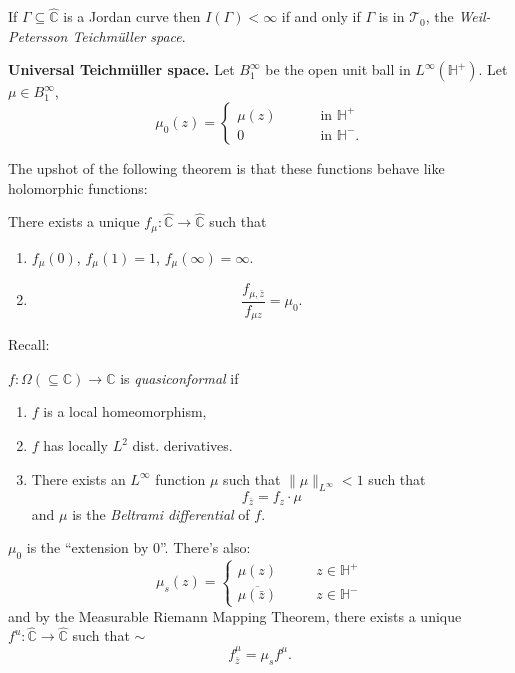 \begin{theorem}[Wang]
\label{theorem-wang}
If $\Gamma \subseteq \hat{ \mathbb{C}}$
is a Jordan curve then
$I(\Gamma) < \infty$ if and only if
$\Gamma$ is in $\mathcal{T}_0$,
the {\it Weil-Petersson Teichmüller space}.
\end{theorem}

\medskip\noindent
{\bf Universal Teichmüller space.}
Let
$B_1^{\infty}$ be the open unit ball in
$L^\infty(\mathbb{H}^+)$.
Let $\mu \in B_1^\infty$,
$$
\mu_0(z)=
\begin{cases}
\mu(z)\qquad &\text{ in }\mathbb{H}^+ \\
0\qquad &\text{ in }\mathbb{H}^-.
\end{cases}
$$

The upshot of the following theorem
is that these functions behave
like holomorphic functions:

\begin{theorem}
\label{theorem-measurable-rmt}
There exists a unique $f_\mu:\hat{\mathbb{C}}
\to \hat{\mathbb{C}}$ such that
\begin{enumerate}
\item $f_\mu(0)$, $f_\mu(1)=1$,
 $f_\mu(\infty)=\infty$.
\item 
$$
\frac{f_{\mu,\bar{z}}}{
f_{\mu z}}=\mu_0.
$$
\end{enumerate}
\end{theorem}

\noindent
Recall:

\begin{definition}
\label{definition-quasiconformal-map}
$f:\Omega(\subseteq\mathbb{C})
\to \mathbb{C}$
is {\it quasiconformal} if
\begin{enumerate}
\item $f$ is a local homeomorphism,
\item $f$ has locally $L^2$ 
dist. derivatives.
\item There exists an $L^\infty$
function $\mu$ such that
$\|\mu\|_{L^\infty}<1$ such that
$$
f_{\bar{z}}=f_z\cdot \mu
$$
and $\mu$ is the {\it Beltrami differential} 
of $f$.
\end{enumerate}
\end{definition}

\noindent
$\mu_0$ is the ``extension by $0$''.
There's also:
$$
\mu_s(z)
=\begin{cases}
\mu(z)\qquad &z \in \mathbb{H}^+ \\
\overline{\mu(\bar{z})}\qquad &
z \in \mathbb{H}^-
\end{cases}
$$
and by the Measurable Riemann Mapping 
Theorem, there exists a unique
$f^u:\hat{\mathbb{C}} \to \hat{\mathbb{C}}$
such that $\sim$
$$
f_{\bar{z}}^\mu
=\mu_s f^\mu.
$$

